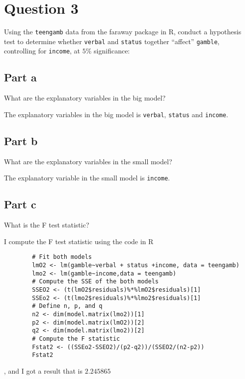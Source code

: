 \section{Question 3}

\begin{question}
    Using the \verb+teengamb+ data from the faraway package in R, conduct a hypothesis test to determine whether \verb+verbal+ and \verb+status+ together “affect” \verb+gamble+, controlling for \verb+income+, at $5\%$ significance:
\end{question}

\subsection{Part a}

\begin{question}
    What are the explanatory variables in the big model?
\end{question}

\begin{answer}
    The explanatory variables in the big model is \verb+verbal+, \verb+status+ and \verb+income+.
\end{answer}

\subsection{Part b}

\begin{question}
    What are the explanatory variables in the small model?
\end{question}

\begin{answer}
    The explanatory variable in the small model is \verb+income+.
\end{answer}

\subsection{Part c}

\begin{question}
    What is the F test statistic?
\end{question}

\begin{answer}
    I compute the F test statistic using the code in R
    \begin{verbatim}
        # Fit both models
        lmO2 <- lm(gamble~verbal + status +income, data = teengamb)
        lmo2 <- lm(gamble~income,data = teengamb)
        # Compute the SSE of the both models
        SSEO2 <- (t(lmO2$residuals)%*%lmO2$residuals)[1]
        SSEo2 <- (t(lmo2$residuals)%*%lmo2$residuals)[1]
        # Define n, p, and q
        n2 <- dim(model.matrix(lmo2))[1]
        p2 <- dim(model.matrix(lmO2))[2]
        q2 <- dim(model.matrix(lmo2))[2]
        # Compute the F statistic
        Fstat2 <- ((SSEo2-SSEO2)/(p2-q2))/(SSEO2/(n2-p2))
        Fstat2
    \end{verbatim}
    , and I got a result that is $2.245865$
\end{answer}

